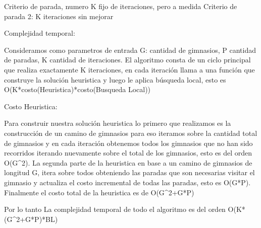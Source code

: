 Criterio de parada, numero K fijo de iteraciones, pero a medida
Criterio de parada 2: K iteraciones sin mejorar

Complejidad temporal:

Consideramos como parametros de entrada G: cantidad de gimnasios, P cantidad de paradas, K cantidad de iteraciones.
El algoritmo consta de un ciclo principal que realiza exactamente K iteraciones, en cada iteración llama a una función que construye la solución heuristica y luego le aplica búsqueda local, esto es O(K*costo(Heuristica)*costo(Busqueda Local))

Costo Heuristica:

Para construir nuestra solución heuristica lo primero que realizamos es la construcción de un camino de gimnasios para eso iteramos sobre la cantidad total de gimnasios y en cada iteración obtenemos todos los gimnasios que no han sido recorridos iterando nuevamente sobre el total de los gimnasios, esto es del orden O(G^2).
La segunda parte de la heuristica en base a un camino de gimnasios de longitud G, itera sobre todos obteniendo las paradas que son necesarias visitar el gimnasio y actualiza el costo incremental de todas las paradas, esto es O(G*P). Finalmente el costo total de la heuristica es de O(G^2+G*P)

Por lo tanto La complejidad temporal de todo el algoritmo es del orden O(K*(G^2+G*P)*BL)


